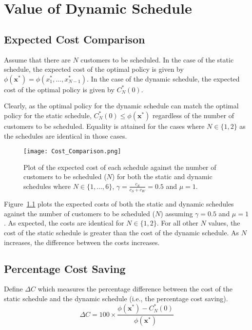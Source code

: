 \chapter{Value of Dynamic Schedule}

\section{Expected Cost Comparison}

Assume that there are $N$ customers to be scheduled. In the case of the static schedule, the expected cost of the optimal policy is given by $\phi (\mathbf{x}^{*}) = \phi (x_{1}^{*}, \ldots, x_{N - 1}^{*})$. In the case of the dynamic schedule, the expected cost of the optimal policy is given by $C_{N}^{*} (0)$.

Clearly, as the optimal policy for the dynamic schedule can match the optimal policy for the static schedule, $C_{N}^{*} (0) \leq \phi (\mathbf{x}^{*})$ regardless of the number of customers to be scheduled. Equality is attained for the cases where $N \in \{ 1, 2 \}$ as the schedules are identical in those cases.

\begin{figure}[htb]
	\centering
	\texttt{[image: Cost\_Comparison.png]}
	\caption{Plot of the expected cost of each schedule against the number of customers to be scheduled ($N$) for both the static and dynamic schedules where $N \in \{ 1, \ldots, 6 \}$, $\gamma = \frac{c_{S}}{c_{S} + c_{W}} = 0.5$ and $\mu = 1$.}
	\label{Graph_Cost_Comparison}
\end{figure}

Figure~\ref{Graph_Cost_Comparison} plots the expected costs of both the static and dynamic schedules against the number of customers to be scheduled ($N$) assuming $\gamma = 0.5$ and $\mu = 1$. As expected, the costs are identical for $N \in \{ 1, 2 \}$. For all other $N$ values, the cost of the static schedule is greater than the cost of the dynamic schedule. As $N$ increases, the difference between the costs increases.

\section{Percentage Cost Saving}

Define $\Delta C$  which measures the percentage difference between the cost of the static schedule and the dynamic schedule (i.e., the percentage cost saving).
\begin{equation}
	\Delta C = 100 \times \frac{\phi (\mathbf{x}^{*}) - C_{N}^{*} (0)}{\phi (\mathbf{x}^{*})}
\end{equation}

